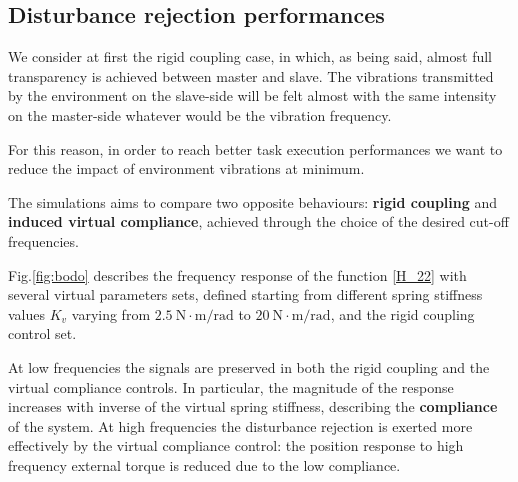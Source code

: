 \subsection{Disturbance rejection performances}

We consider at first the rigid coupling case, in which, as being said, almost
full transparency is achieved between master and slave. The vibrations
transmitted by the environment on the slave-side will be felt almost with the same intensity on the master-side whatever would be the vibration frequency.

For this reason, in order to reach better task execution performances we want to
reduce the impact of environment vibrations at minimum.

The simulations aims to compare two opposite behaviours: \textbf{rigid coupling}
and \textbf{induced virtual compliance}, achieved through the choice of
the desired cut-off frequencies.

Fig.\ref{fig:bodo} describes the frequency response of the function \eqref{H_22} with several virtual parameters sets, defined starting from different spring stiffness values $ K_v $ varying from $ 2.5 \ \text{N}\cdot\text{m}/\text{rad} $ to $ 20 \ \text{N}\cdot\text{m}/\text{rad} $, and the rigid coupling control set.

At low frequencies the signals are preserved in both the rigid coupling and the virtual compliance controls. In particular, the magnitude of the response increases with inverse of the virtual spring stiffness, describing the \textbf{compliance} of the system. At high frequencies the disturbance rejection is exerted more effectively by the virtual compliance control: the position response to high frequency external torque is reduced due to the low compliance.




